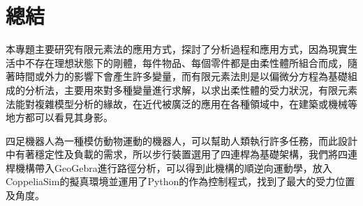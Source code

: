 \chapter{總結}
本專題主要研究有限元素法的應用方式，探討了分析過程和應用方式，因為現實生活中不存在理想狀態下的剛體，每件物品、每個零件都是由柔性體所組合而成，隨著時間或外力的影響下會產生許多變量，而有限元素法則是以偏微分方程為基礎組成的分析法，主要用來對多種變量進行求解，以求出柔性體的受力狀況，有限元素法能對複雜模型分析的緣故，在近代被廣泛的應用在各種領域中，在建築或機械等地方都可以看見其身影。

四足機器人為一種模仿動物運動的機器人，可以幫助人類執行許多任務，而此設計中有著穩定性及負載的需求，所以步行裝置選用了四連桿為基礎架構，我們將四連桿機構帶入GeoGebra進行路徑分析，可以得到此機構的順逆向運動學，放入CoppeliaSim的擬真環境並運用了Python的作為控制程式，找到了最大的受力位置及角度。


\newpage
